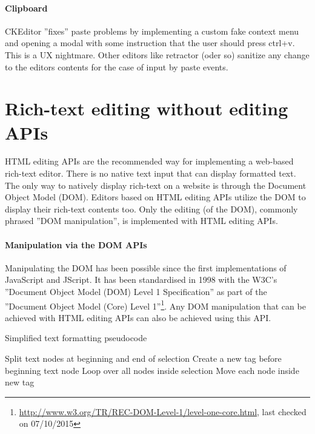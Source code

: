 \paragraph{Clipboard} CKEditor ''fixes'' paste problems by implementing a custom fake context menu and opening a modal with some instruction that the user should press ctrl+v. This is a UX nightmare. Other editors like retractor (oder so) sanitize any change to the editors contents for the case of input by paste events.

\section{Rich-text editing without editing APIs}

HTML editing APIs are the recommended way for implementing a web-based rich-text editor. There is no native text input that can display formatted text. The only way to natively display rich-text on a website is through the Document Object Model (DOM). Editors based on HTML editing APIs utilize the DOM to display their rich-text contents too. Only the editing (of the DOM), commonly phrased ''DOM manipulation'', is implemented with HTML editing APIs.

\paragraph{Manipulation via the DOM APIs} Manipulating the DOM has been possible since the first implementations of JavaScript and JScript. It has been standardised in 1998 with the W3C's ''Document Object Model (DOM) Level 1 Specification'' as part of the ''Document Object Model (Core) Level 1''\footnote{\url{http://www.w3.org/TR/REC-DOM-Level-1/level-one-core.html}, last checked on 07/10/2015}. Any DOM manipulation that can be achieved with HTML editing APIs can also be achieved using this API.


\begin{algorithm}
\caption{Simplified text formatting pseudocode}
\label{alg:format_pseudocode}
\begin{algorithmic}[1]
\State Split text nodes at beginning and end of selection
\State Create a new tag before beginning text node
\State Loop over all nodes inside selection
\State Move each node inside new tag
\end{algorithmic}
\end{algorithm}

